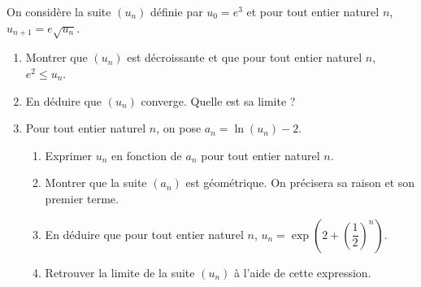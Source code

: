 \documentclass[11pt,fleqn, openany]{book} %
\begin{document}
\begin{exercise}[topic=log02]On considère la suite $(u_n)$ définie par $u_0=e^3$ et pour tout entier naturel $n$, $u_{n+1}=e\sqrt{u_n}$.
\begin{enumerate}
\item Montrer que $(u_n)$ est décroissante et que pour tout entier naturel $n$, $e^2 \leqslant u_n$.
\item En déduire que $(u_n)$ converge. Quelle est sa limite ?
\item Pour tout entier naturel $n$, on pose $a_n=\ln(u_n)-2$.
\begin{enumerate}
\item Exprimer $u_n$ en fonction de $a_n$ pour tout entier naturel $n$.
\item Montrer que la suite $(a_n)$ est géométrique. On précisera sa raison et son premier terme.
\item En déduire que pour tout entier naturel $n$, $u_n=\exp \left(2 + \left(\dfrac{1}{2}\right)^n\right)$.
\item Retrouver la limite de la suite $(u_n)$ à l'aide de cette expression.
\end{enumerate}
\end{enumerate} \end{exercise}
\end{document}
